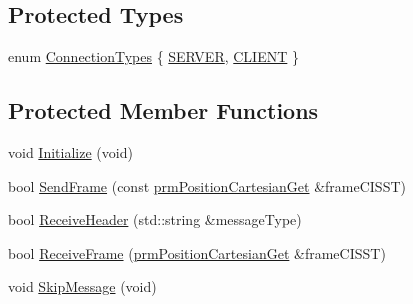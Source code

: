 \subsection*{Protected Types}
\begin{DoxyCompactItemize}
\item 
enum \hyperlink{classmts_open_i_g_t_link_aa7353a6a3f98f611defbaf89f13c8a27}{Connection\-Types} \{ \hyperlink{classmts_open_i_g_t_link_aa7353a6a3f98f611defbaf89f13c8a27a9cbc41def3c5107a96ae88dc2b81be4c}{S\-E\-R\-V\-E\-R}, 
\hyperlink{classmts_open_i_g_t_link_aa7353a6a3f98f611defbaf89f13c8a27a25025b3db414b3c15bc4c6664b876065}{C\-L\-I\-E\-N\-T}
 \}
\end{DoxyCompactItemize}
\subsection*{Protected Member Functions}
\begin{DoxyCompactItemize}
\item 
void \hyperlink{classmts_open_i_g_t_link_a77e185ccfb62504a0715138865d15b85}{Initialize} (void)
\item 
bool \hyperlink{classmts_open_i_g_t_link_a179b3a9dbe4601891943a646a2692329}{Send\-Frame} (const \hyperlink{classprm_position_cartesian_get}{prm\-Position\-Cartesian\-Get} \&frame\-C\-I\-S\-S\-T)
\item 
bool \hyperlink{classmts_open_i_g_t_link_aed77b6cd845636b25631465c28540ed2}{Receive\-Header} (std\-::string \&message\-Type)
\item 
bool \hyperlink{classmts_open_i_g_t_link_a9299853f065591da9999bc027f12c70a}{Receive\-Frame} (\hyperlink{classprm_position_cartesian_get}{prm\-Position\-Cartesian\-Get} \&frame\-C\-I\-S\-S\-T)
\item 
void \hyperlink{classmts_open_i_g_t_link_abaa5ab92e7ce6b8af3a777ca0e36605e}{Skip\-Message} (void)
\end{DoxyCompactItemize}
